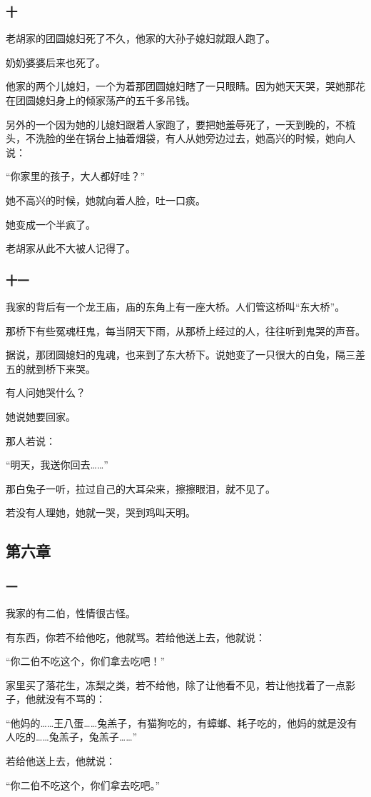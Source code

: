 \subsubsection*{十}
\par 老胡家的团圆媳妇死了不久，他家的大孙子媳妇就跟人跑了。
\par 奶奶婆婆后来也死了。
\par 他家的两个儿媳妇，一个为着那团圆媳妇瞎了一只眼睛。因为她天天哭，哭她那花在团圆媳妇身上的倾家荡产的五千多吊钱。
\par 另外的一个因为她的儿媳妇跟着人家跑了，要把她羞辱死了，一天到晚的，不梳头，不洗脸的坐在锅台上抽着烟袋，有人从她旁边过去，她高兴的时候，她向人说：
\par “你家里的孩子，大人都好哇？”
\par 她不高兴的时候，她就向着人脸，吐一口痰。
\par 她变成一个半疯了。
\par 老胡家从此不大被人记得了。
\subsubsection*{十一}
\par 我家的背后有一个龙王庙，庙的东角上有一座大桥。人们管这桥叫“东大桥”。
\par 那桥下有些冤魂枉鬼，每当阴天下雨，从那桥上经过的人，往往听到鬼哭的声音。
\par 据说，那团圆媳妇的鬼魂，也来到了东大桥下。说她变了一只很大的白兔，隔三差五的就到桥下来哭。
\par 有人问她哭什么？
\par 她说她要回家。
\par 那人若说：
\par “明天，我送你回去……”
\par 那白兔子一听，拉过自己的大耳朵来，擦擦眼泪，就不见了。
\par 若没有人理她，她就一哭，哭到鸡叫天明。

\subsection{第六章}

\subsubsection*{一}
\par 我家的有二伯，性情很古怪。
\par 有东西，你若不给他吃，他就骂。若给他送上去，他就说：
\par “你二伯不吃这个，你们拿去吃吧！”
\par 家里买了落花生，冻梨之类，若不给他，除了让他看不见，若让他找着了一点影子，他就没有不骂的：
\par “他妈的……王八蛋……兔羔子，有猫狗吃的，有蟑螂、耗子吃的，他妈的就是没有人吃的……兔羔子，兔羔子……”
\par 若给他送上去，他就说：
\par “你二伯不吃这个，你们拿去吃吧。”
